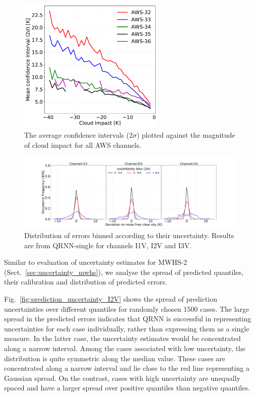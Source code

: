 \documentclass[amt, manuscript]{copernicus}
\begin{document}
\begin{figure}[t]
	\includegraphics[width = 70mm]{Figures/cloud_impact_uncertainty_AWS.pdf}	
	\caption{The average confidence intervals (2$\sigma$) plotted against the magnitude of cloud impact for all AWS channels.}
	\label{fig:uncertainty_cloud_impact}	
\end{figure}
\begin{figure}[t]
	\includegraphics[width=\textwidth]{Figures/PDF_uncertainty_bins_QRNN-single.pdf}	
	\caption{Distribution of errors binned according to their uncertainty. Results are from QRNN-single for channels I1V, I2V and I3V.}
	\label{fig:error_distribution_uncertainty_bins}	
\end{figure}

Similar to evaluation of uncertainty estimates for MWHS-2 (Sect.~\ref{sec:uncertainty_mwhs}), we analyse the spread of predicted quantiles, their calibration and distribution of predicted errors. 

Fig.~\ref{fig:prediction_uncertainty_I2V} shows the spread of prediction uncertainties over different quantiles for randomly chosen 1500 cases. The large spread in the predicted errors indicates that QRNN is successful in representing uncertainties for each case individually, rather than expressing them as a single measure. In the latter case, the uncertainty estimates would be concentrated along a narrow interval. Among the cases associated with low uncertainty, the distribution is quite symmetric along the median value. These cases are concentrated along a narrow interval and lie close to the red line representing a Gaussian spread. On the contrast, cases with high uncertainty are unequally spaced and have a larger spread over positive quantiles than negative quantiles. 
\end{document}
